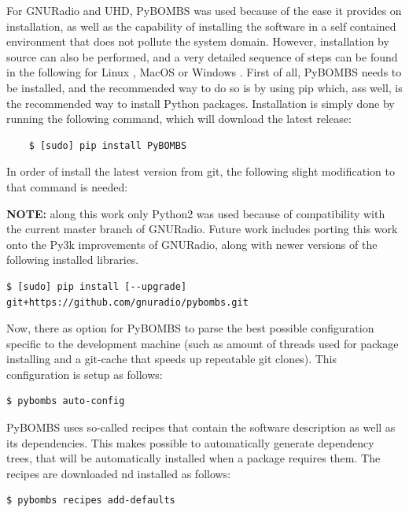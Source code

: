 For GNURadio and \ac{UHD}, \ac{PyBOMBS} was used because of the ease it provides on installation, as well as the capability of installing the software in a self contained environment that does not pollute the system domain. However, installation by source can also be performed, and a very detailed sequence of steps can be found in the following for Linux \cite{Linux}, MacOS \cite{OSX} or Windows \cite{Windows}. First of all, \ac{PyBOMBS} needs to be installed, and the recommended way to do so is by using \ac{pip} which, ass well, is the recommended way to install Python packages.  Installation is simply done by running the following command, which will download the latest release:

\begin{lstlisting}
    $ [sudo] pip install PyBOMBS
\end{lstlisting}

In order of install the latest version from git, the following slight modification to that command is needed:

\textbf{NOTE:} along this work only Python2 was used because of compatibility with the current master branch of GNURadio. Future work includes porting this work onto the Py3k improvements of GNURadio, along with newer versions of the following installed libraries.

\begin{lstlisting}[breaklines=true]
    $ [sudo] pip install [--upgrade] git+https://github.com/gnuradio/pybombs.git
\end{lstlisting}

Now, there as option for \ac{PyBOMBS} to parse the best possible configuration specific to the development machine (such as amount of threads used for package installing and a git-cache that speeds up repeatable git clones). This configuration is setup as follows:

\begin{lstlisting}[breaklines=true]
    $ pybombs auto-config
\end{lstlisting}

\ac{PyBOMBS} uses so-called recipes that contain the software description as well as its dependencies. This makes possible to automatically generate dependency trees, that will be automatically installed when a package requires them. The recipes are downloaded nd installed as follows:

\begin{lstlisting}[breaklines=true]
    $ pybombs recipes add-defaults
\end{lstlisting}

